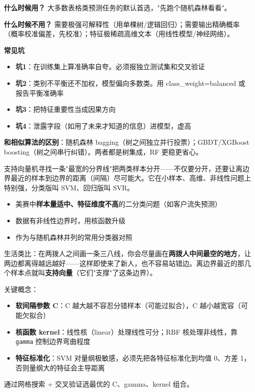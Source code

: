 \begin{algonotes}
\textbf{什么时候用？} 大多数表格类预测任务的默认首选，"先跑个随机森林看看"。

\textbf{什么时候不用？} 需要极强可解释性（用单棵树/逻辑回归）；需要输出精确概率（概率校准偏差，先校准）；特征极稀疏高维文本（用线性模型/神经网络）。

\textbf{常见坑}
\begin{itemize}
    \item \textbf{坑1}：在训练集上算准确率自夸。必须报独立测试集和交叉验证
    \item \textbf{坑2}：类别不平衡还不加权，模型偏向多数类。用 class\_weight=balanced 或报告平衡准确率
    \item \textbf{坑3}：把特征重要性当成因果方向
    \item \textbf{坑4}：泄露字段（如用了未来才知道的信息）进模型，虚高
\end{itemize}

\textbf{和相似算法的区别}：随机森林 bagging（树之间独立并行投票）；GBDT/XGBoost boosting（树之间串行纠错）。两者都是树集成，RF 更稳更省心。
\end{algonotes}


\begin{algointro}
支持向量机寻找一条"最宽的分界线"把两类样本分开——不仅要分开，还要让离边界最近的样本到边界的距离（间隔）尽可能大。它在小样本、高维、非线性问题上特别强，分类版叫 SVM、回归版叫 SVR。
\end{algointro}

\begin{algoscene}
\begin{itemize}
    \item 美赛中\textbf{样本量适中、特征维度不高}的二分类问题（如客户流失预测）
    \item 数据有非线性边界时，用核函数升级
    \item 作为与随机森林并列的常用分类器对照
\end{itemize}
\end{algoscene}

\begin{algoprinciple}
生活类比：在两拨人之间画一条三八线，你会尽量画在\textbf{两拨人中间最空的地方}，让两边都离得越远越好——这样即使来了新人，也不容易站错边。离边界最近的那几个样本点就叫\textbf{支持向量}（它们"支撑"了这条边界）。

关键概念：
\begin{itemize}
    \item \textbf{软间隔参数 C}：C 越大越不容忍分错样本（可能过拟合），C 越小越宽容（可能欠拟合）
    \item \textbf{核函数 kernel}：线性核（linear）处理线性可分；RBF 核处理非线性，靠 \texttt{gamma} 控制边界弯曲程度
    \item \textbf{特征标准化}：SVM 对量纲极敏感，必须先把各特征标准化到均值 0、方差 1，否则量纲大的特征会主导距离
\end{itemize}

通过网格搜索 + 交叉验证选最优的 C、gamma、kernel 组合。
\end{algoprinciple}

